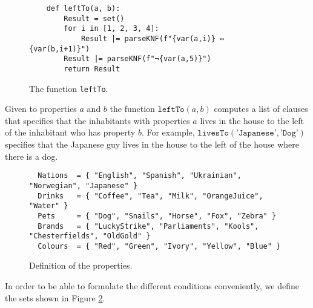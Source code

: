 \begin{figure}[!ht]
\centering
\begin{verbatim}
    def leftTo(a, b):
        Result = set()
        for i in [1, 2, 3, 4]:
            Result |= parseKNF(f"{var(a,i)} ↔ {var(b,i+1)}")
        Result |= parseKNF(f"¬{var(a,5)}")
        return Result
\end{verbatim}
\vspace*{-0.3cm}
\caption{The function \texttt{leftTo}.}
\label{fig:leftTo}
\end{figure}

Given to properties $a$ and $b$ the function $\texttt{leftTo}(a, b)$ computes a
list of clauses that specifies that the inhabitants with properties $a$ lives in
the house to the left of the inhabitant who has property $b$.  For example,
$\texttt{livesTo}(\texttt{'Japanese'}, \texttt{'Dog'})$ specifies that the
Japanese guy lives in the house to the left of the house where there is a dog.

\begin{figure}[!ht]
\centering
\begin{verbatim}
  Nations  = { "English", "Spanish", "Ukrainian", "Norwegian", "Japanese" }
  Drinks   = { "Coffee", "Tea", "Milk", "OrangeJuice", "Water" }
  Pets     = { "Dog", "Snails", "Horse", "Fox", "Zebra" }
  Brands   = { "LuckyStrike", "Parliaments", "Kools", "Chesterfields", "OldGold" }
  Colours  = { "Red", "Green", "Ivory", "Yellow", "Blue" }                
\end{verbatim}
\vspace*{-0.3cm}
\caption{Definition of the properties.}
\label{fig:properties}
\end{figure}

In order to be able to formulate the different conditions conveniently, we define the sets
shown in Figure \ref{fig:properties}.

